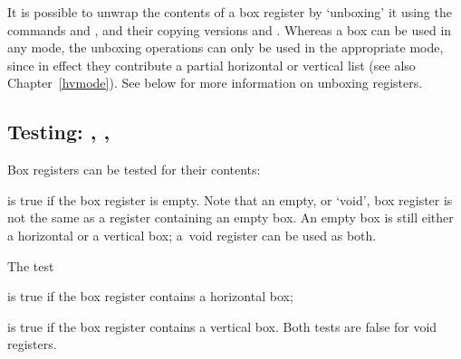\documentclass{book}
\begin{document}
It is possible to unwrap the contents of a box register
by `unboxing' it using the commands  and ,
and their copying versions  and .
Whereas a box can be used in any mode, the
unboxing operations can only be used in the appropriate mode,
since in effect they contribute a partial
horizontal or vertical list (see also Chapter~\ref{hvmode}).
See below for more information on unboxing registers.

\subsection{Testing: , , }

Box
registers can be tested for their contents:
\begin{disp}\end{disp}
is true if the box register is empty.
Note that an empty, or `void',
box register is not the same as a register containing an empty box.
An empty box is still either a horizontal or a vertical box;
a~void register can be used as both.

The test
\begin{disp}\end{disp}
is true if the box register contains a horizontal box;
\begin{disp}\end{disp}
is true if the box register contains a vertical box.
Both tests are false for void registers.
\end{document}
